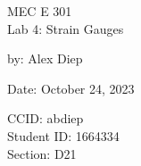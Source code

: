 \documentclass[letterpaper,12pt]{article} %
\renewcommand{\thesection}{Question \arabic{section}} %
\begin{document}
\begin{titlepage}
    \centering
    \vspace*{2cm} %
    
    \Huge {MEC E 301 \\Lab 4: Strain Gauges} \\
    \vspace{1cm} %
    
    \Large by: Alex Diep \\
    \vspace{1cm} %

    \Large Date: October 24, 2023 \\ %
    \vspace{4cm} %

    \normalsize CCID: abdiep \\
    \normalsize Student ID: 1664334 \\ 
    \normalsize Section: D21 \\
    
    \vfill %
    
    
\end{titlepage}
\renewcommand\arraystretch{1.5}








\newpage
\appendix
\renewcommand\thefigure{\thesection.\arabic{figure}}    
\renewcommand\thetable{\thesection.\arabic{table}}
\end{document}
